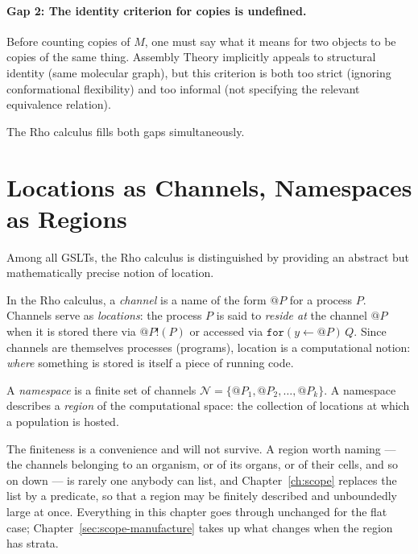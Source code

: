 \paragraph{Gap 2: The identity criterion for copies is undefined.}
Before counting copies of $M$, one must say what it means for two
objects to be copies of the same thing.
Assembly Theory implicitly appeals to structural identity (same
molecular graph), but this criterion is both too strict (ignoring
conformational flexibility) and too informal (not specifying the
relevant equivalence relation).

The Rho calculus fills both gaps simultaneously.

\section{Locations as Channels, Namespaces as Regions}

Among all GSLTs, the Rho calculus is distinguished by providing
an abstract but mathematically precise notion of location.

\begin{definition}
In the Rho calculus, a \emph{channel} is a name of the form
$@P$ for a process $P$.
Channels serve as \emph{locations}: the process $P$ is said to
\emph{reside at} the channel $@P$ when it is stored there via
$@P!(P)$ or accessed via $\mathtt{for}(y \leftarrow @P)\,Q$.
Since channels are themselves processes (programs), location is
a computational notion: \emph{where} something is stored is itself
a piece of running code.
\end{definition}

\begin{definition}[Namespace]
A \emph{namespace} is a finite set of channels
$\mathcal{N} = \{@P_1, @P_2, \ldots, @P_k\}$.
A namespace describes a \emph{region} of the computational space:
the collection of locations at which a population is hosted.
\end{definition}

\begin{remark}
\label{rmk:finiteness-provisional}
The finiteness is a convenience and will not survive.
A region worth naming --- the channels belonging to an organism, or
of its organs, or of their cells, and so on down --- is rarely one
anybody can list, and Chapter~\ref{ch:scope} replaces the list by a
predicate, so that a region may be finitely described and unboundedly
large at once.
Everything in this chapter goes through unchanged for the flat case;
Chapter~\ref{sec:scope-manufacture} takes up what changes when the
region has strata.
\end{remark}


